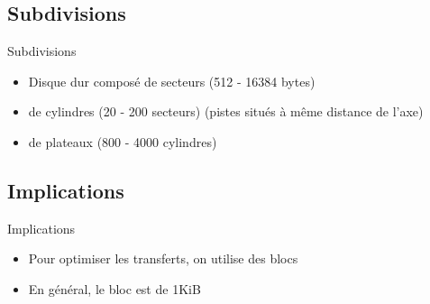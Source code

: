 \section{\sectitle}
\begin{frame}{\sectitle}

\def\subsectitle{Subdivisions}
\subsection{\subsectitle}
\begin{block}{\subsectitle}
\begin{itemize}
    \item Disque dur composé de secteurs (512 - 16384 bytes)
    \item de cylindres (20 - 200 secteurs) (pistes situés à même distance de
        l'axe)
    \item de plateaux (800 - 4000 cylindres)
\end{itemize}
\end{block}


\def\subsectitle{Implications}
\subsection{\subsectitle}
\begin{block}{\subsectitle}
    \begin{itemize}
        \item Pour optimiser les transferts, on utilise des blocs
        \item En général, le bloc est de 1KiB
    \end{itemize}
\end{block}
\end{frame}


\def\sectitle{Stockage de données}
